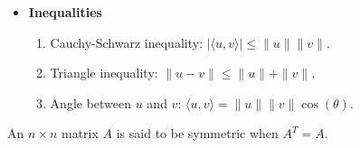 \documentclass[12pt,letterpaper]{article}
\begin{document}
\begin{itemize}
\item[(f)] \textbf{Inequalities}
\begin{enumerate}
    \item Cauchy-Schwarz inequality: \qquad
    $
    |\langle u, v \rangle| \leq \|u\| \|v\|.
    $
    \item Triangle inequality:
    \qquad $    \|u - v\| \leq \|u\| + \|v\|.
    $
    \item Angle between $u$ and $v$: 
    \qquad $
    \langle u, v \rangle = \|u\| \|v\| \cos(\theta).
    $
\end{enumerate}
\end{itemize}

\begin{defn}
An $n \times n$ matrix $A$ is said to be symmetric when $A^T = A.$
\end{defn}
\end{document}
